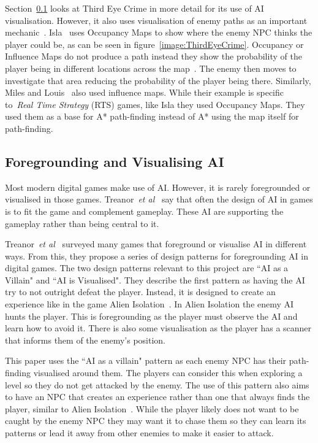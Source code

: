 \documentclass[journal]{IEEEtran}
\begin{document}
	Section~\ref{VisualisingAI} looks at Third Eye Crime in more detail for its use of AI visualisation. However, it also uses visualisation of enemy paths as an important mechanic~\cite{Isla2014, game:ThirdEyeCrime}.  Isla~\cite{Isla2014} uses Occupancy Maps to show where the enemy NPC thinks the player could be, as can be seen in figure~\ref{image:ThirdEyeCrime}. Occupancy or Influence Maps do not produce a path instead they show the probability of the player being in different locations across the map~\cite{Isla2014, Miles2006}. The enemy then moves to investigate that area reducing the probability of the player being there.  Similarly, Miles and Louis~\cite{Miles2006} also used influence maps. While their example is specific to~\textit{Real Time Strategy} (RTS) games, like Isla they used Occupancy Maps.  They used them as a base for A* path-finding instead of A* using the map itself for path-finding.
	
	
	\subsection{Foregrounding and Visualising AI} \label{VisualisingAI}
	Most modern digital games make use of AI.  However, it is rarely foregrounded or visualised in those games. Treanor~\textit{et al}~\cite{treanor2015} say that often the design of AI in games is to fit the game and complement gameplay. These AI are supporting the gameplay rather than being central to it.
	
	Treanor~\textit{et al}~\cite{treanor2015} surveyed many games that foreground or visualise AI in different ways.   From this, they propose a series of design patterns for foregrounding AI in digital games. 
	The two design patterns relevant to this project are ``AI as a Villain" and ``AI is Visualised".  They describe the first pattern as having the AI try to not outright defeat the player. Instead, it is designed to create an experience like in the game Alien Isolation~\cite{treanor2015, game:AlienIsolation}.  In Alien Isolation the enemy AI hunts the player. This is foregrounding as the player must observe the AI and learn how to avoid it. There is also some visualisation as the player has a scanner that informs them of the enemy's position. 
	
	This paper uses the ``AI as a villain" pattern as each enemy NPC has their path-finding visualised around them. The players can consider this when exploring a level so they do not get attacked by the enemy. The use of this pattern also aims to have an NPC that creates an experience rather than one that always finds the player, similar to Alien Isolation~\cite{game:AlienIsolation,treanor2015}. While the player likely does not want to be caught by the enemy NPC they may want it to chase them so they can learn its patterns or lead it away from other enemies to make it easier to attack. 
	
\end{document}
